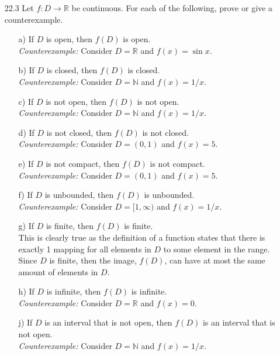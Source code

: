 \documentclass[12pt]{article}
\begin{document}
\begin{enumerate}
\begin{enumerate}
\item[22.3] Let $f: D \rightarrow \mathbb{R}$ be continuous. For each of the following, prove or give a counterexample.
\begin{enumerate}
\item[a)] If $D$ is open, then $f(D)$ is open. \\
\emph{Counterexample:} Consider $D = \mathbb{R}$ and $f(x) = \sin x$.
\item[b)] If $D$ is closed, then $f(D)$ is closed. \\
\emph{Counterexample:} Consider $D = \mathbb{N}$ and $f(x) = 1/x$.
\item[c)] If $D$ is not open, then $f(D)$ is not open. \\
\emph{Counterexample:} Consider $D = \mathbb{N}$ and $f(x) = 1/x$.
\item[d)] If $D$ is not closed, then $f(D)$ is not closed. \\
\emph{Counterexample:} Consider $D = (0, 1)$ and $f(x) = 5$.
\item[e)] If $D$ is not compact, then $f(D)$ is not compact. \\
\emph{Counterexample:} Consider $D = (0, 1)$ and $f(x) = 5$.
\item[f)] If $D$ is unbounded, then $f(D)$ is unbounded. \\
\emph{Counterexample:} Consider $D = [1, \infty)$ and $f(x) = 1/x$.
\item[g)] If $D$ is finite, then $f(D)$ is finite. \\
This is clearly true as the definition of a function states that
there is exactly 1 mapping for all elements in $D$ 
to some element in the range. Since $D$ is finite, then the 
image, $f(D)$, can have at most the same amount of elements in $D$.
\item[h)] If $D$ is infinite, then $f(D)$ is infinite. \\
\emph{Counterexample:} Consider $D = \mathbb{R}$ and $f(x) = 0$.
\item[j)] If $D$ is an interval that is not open, then $f(D)$ is an interval that is not open. \\
\emph{Counterexample:} Consider $D = \mathbb{N}$ and $f(x) = 1/x$.
\end{enumerate}


\end{enumerate}
\end{enumerate}
\end{document}
